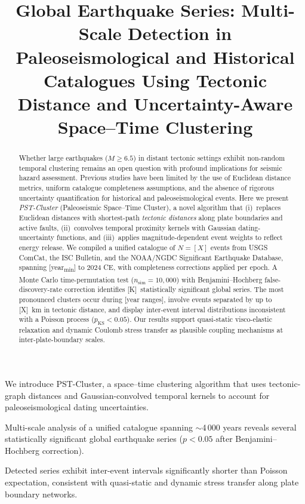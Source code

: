\documentclass[draft]{agujournal2019}
\begin{document}
\title{Global Earthquake Series: Multi-Scale Detection in Paleoseismological
       and Historical Catalogues Using Tectonic Distance and Uncertainty-Aware
       Space–Time Clustering}




\begin{keypoints}
\item We introduce PST-Cluster, a space–time clustering algorithm that uses
      tectonic-graph distances and Gaussian-convolved temporal kernels to
      account for paleoseismological dating uncertainties.
\item Multi-scale analysis of a unified catalogue spanning $\sim$4\,000 years
      reveals several statistically significant global earthquake series
      ($p < 0.05$ after Benjamini–Hochberg correction).
\item Detected series exhibit inter-event intervals significantly shorter than
      Poisson expectation, consistent with quasi-static and dynamic stress
      transfer along plate boundary networks.
\end{keypoints}

\begin{abstract}
Whether large earthquakes ($M \geq 6.5$) in distant tectonic settings exhibit
non-random temporal clustering remains an open question with profound
implications for seismic hazard assessment.  Previous studies have been
limited by the use of Euclidean distance metrics, uniform catalogue
completeness assumptions, and the absence of rigorous uncertainty
quantification for historical and paleoseismological events.  Here we present
\textit{PST-Cluster} (Paleoseismic Space–Time Cluster), a novel algorithm that
(i)~replaces Euclidean distances with shortest-path \textit{tectonic distances}
along plate boundaries and active faults, (ii)~convolves temporal proximity
kernels with Gaussian dating-uncertainty functions, and (iii)~applies
magnitude-dependent event weights to reflect energy release.  We compiled a
unified catalogue of $N = [X]$ events from USGS ComCat, the ISC Bulletin, and
the NOAA/NGDC Significant Earthquake Database, spanning [year\textsubscript{min}]
to 2024 CE, with completeness corrections applied per epoch.  A Monte Carlo
time-permutation test ($n_\text{sim} = 10{,}000$) with Benjamini–Hochberg
false-discovery-rate correction identifies [K]~statistically significant global
series.  The most pronounced clusters occur during [year ranges], involve
events separated by up to [X]~km in tectonic distance, and display
inter-event interval distributions inconsistent with a Poisson process
($p_\text{KS} < 0.05$).  Our results support quasi-static visco-elastic
relaxation and dynamic Coulomb stress transfer as plausible coupling
mechanisms at inter-plate-boundary scales.
\end{abstract}
\end{document}

